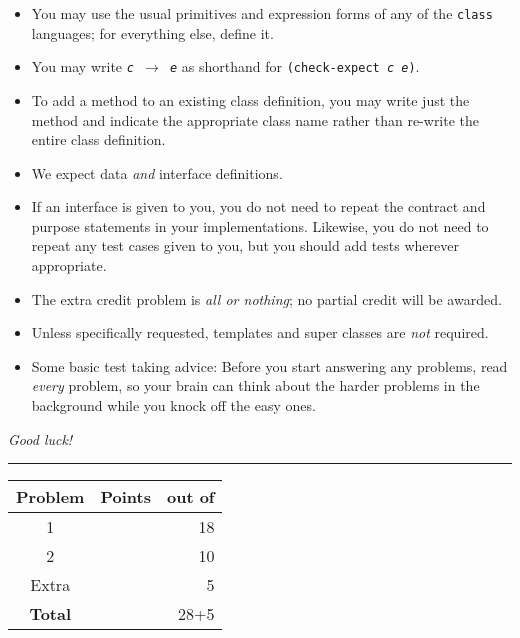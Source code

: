 \documentclass[12pt]{article}                   %
\newcommand\code[1]{\texttt{#1}}
\begin{document}
\noindent\begin{minipage}{8cm}\sloppy
\begin{itemize}
\item You may use the usual primitives and expression forms of any of
  the \code{class} languages; for everything else, define it.

\item You may write {\tt {\slshape c} $\rightarrow$ {\slshape e}} as
  shorthand for
  {\tt (check-expect {\slshape c e})}.

\item To add a method to an existing class definition, you
  may write just the method and indicate the appropriate class name
  rather than re-write the entire class definition.

\item We expect data \emph{and} interface definitions.

\item If an interface is given to you, you do not need to repeat the
  contract and purpose statements in your implementations.  Likewise,
  you do not need to repeat any test cases given to you, but you
  should add tests wherever appropriate.


\item The extra credit problem is \emph{all or nothing};  no partial
  credit will be awarded.

\item Unless specifically requested, templates and super classes are
  \emph{not} required.

\item Some basic test taking advice: Before you start answering
any problems, read \emph{every} problem, so your brain can  think
about the harder problems in the background while you knock off the easy ones.
\end{itemize}

\bigskip

\emph{Good luck!}
\end{minipage}\hfil\begin{minipage}[t]{6cm}
\rule{1cm}{0pt}\begin{tabular}{|c|l|@{/}r|}
\hline
{\bf Problem} & Points & out of \\ \hline
1 & & 18\\ \hline
2 & & 10\\ \hline
Extra & & 5 \\ \hline
{\bf Total} & & 28+5 \\ \hline
\end{tabular}
\end{minipage}
\end{document}
